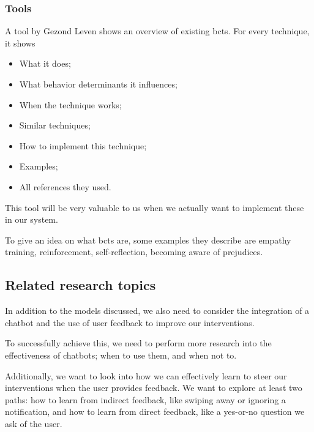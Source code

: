 \subsubsection{Tools}

A tool by Gezond Leven \cite{GedragsveranderingstechniekenGezondLeven} shows an overview of existing \ac{bct}s.
For every technique, it shows 
\begin{itemize}
    \item What it does;
    \item What behavior determinants it influences;
    \item When the technique works;
    \item Similar techniques;
    \item How to implement this technique;
    \item Examples;
    \item All references they used.
\end{itemize}

This tool will be very valuable to us when we actually want to implement these in our system.

To give an idea on what \ac{bct}s are, some examples they describe are empathy training, reinforcement, self-reflection, becoming aware of prejudices.




\subsection{Related research topics}


In addition to the models discussed, we also need to consider the integration of a chatbot and the use of user feedback to improve our interventions.

To successfully achieve this, we need to perform more research into the effectiveness of chatbots; when to use them, and when not to.

Additionally, we want to look into how we can effectively learn to steer our interventions when the user provides feedback. We want to explore at least two paths: how to learn from indirect feedback, like swiping away or ignoring a notification, and how to learn from direct feedback, like a yes-or-no question we ask of the user.
